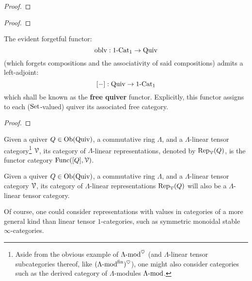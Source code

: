                 \begin{proof}
                    
                \end{proof}
            \begin{definition}
                
            \end{definition}
            \begin{proposition} \label{prop: separatedness_criterion_for_quivers}
                
            \end{proposition}
                \begin{proof}
                    
                \end{proof}
                
            \begin{proposition} \label{prop: free_quivers}
                The evident forgetful functor:
                    $$\oblv: 1\-\Cat_1 \to \Quiv$$
                (which forgets compositions and the associativity of said compositions) admits a left-adjoint:
                    $$[-]: \Quiv \to 1\-\Cat_1$$
                which shall be known as the \textbf{free quiver} functor. Explicitly, this functor assigns to each ($\Sets$-valued) quiver its associated free category.
            \end{proposition}
                \begin{proof}
                    
                \end{proof}
            \begin{definition} \label{def: quiver_representations}
                Given a quiver $Q \in \Ob(\Quiv)$, a commutative ring $\Lambda$, and a $\Lambda$-linear tensor category\footnote{Aside from the obvious example of $\Lambda\mod^{\heart}$ (and $\Lambda$-linear tensor subcategories thereof, like $(\Lambda\mod^{\fin})^{\heart}$), one might also consider categories such as the derived category of $\Lambda$-modules $\Lambda\mod$.} $\calV$, its category of $\Lambda$-linear representations, denoted by $\Rep_{\calV}(Q)$, is the functor category $\Func([Q], \calV)$.
            \end{definition}
            \begin{remark}
                Given a quiver $Q \in \Ob(\Quiv)$, a commutative ring $\Lambda$, and a $\Lambda$-linear tensor category $\calV$, its category of $\Lambda$-linear representations $\Rep_{\calV}(Q)$ will also be a $\Lambda$-linear tensor category.
                
                Of course, one could consider representations with values in categories of a more general kind than linear tensor $1$-categories, such as symmetric monoidal stable $\infty$-categories. 
            \end{remark}
            
